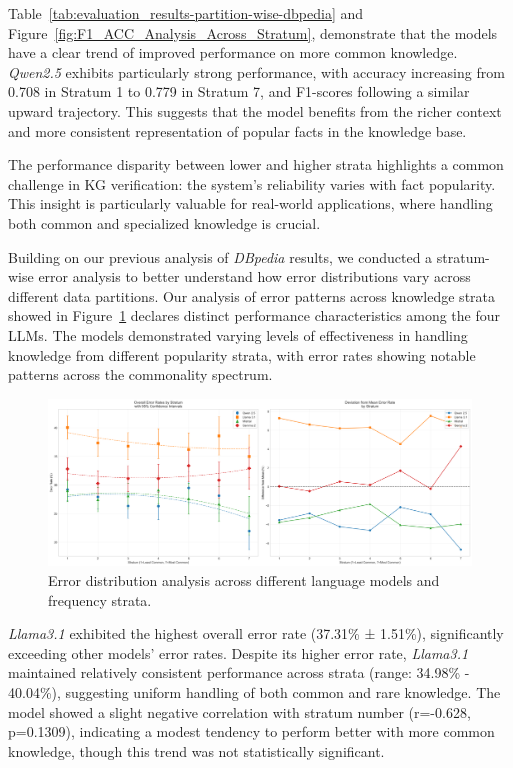 Table~\ref{tab:evaluation_results-partition-wise-dbpedia} and Figure~\ref{fig:F1_ACC_Analysis_Across_Stratum}, demonstrate that the models have a clear trend of improved performance on more common knowledge.
\textit{Qwen2.5} exhibits particularly strong performance, with accuracy increasing from 0.708 in Stratum 1 to 0.779 in Stratum 7, and F1-scores following a similar upward trajectory.
This suggests that the model benefits from the richer context and more consistent representation of popular facts in the knowledge base.

The performance disparity between lower and higher strata highlights a common challenge in \ac{KG} verification: the system's reliability varies with fact popularity.
This insight is particularly valuable for real-world applications, where handling both common and specialized knowledge is crucial.

Building on our previous analysis of \textit{DBpedia} results, we conducted a stratum-wise error analysis to better understand how error distributions vary across different data partitions.
Our analysis of error patterns across knowledge strata showed in Figure~\ref{fig:error_model-comparison_partition-wise} declares distinct performance characteristics among the four LLMs.
The models demonstrated varying levels of effectiveness in handling knowledge from different popularity strata, with error rates showing notable patterns across the commonality spectrum.

\begin{figure}[ht!]
    \centering
    \begin{minipage}[b]{\textwidth}
        \centering
        \includegraphics[width=\textwidth]{res/error_rates_analysis}
    \end{minipage}
    \caption{Error distribution analysis across different language models and frequency strata.}
    \label{fig:error_model-comparison_partition-wise}
\end{figure}

\textit{Llama3.1} exhibited the highest overall error rate (37.31\% ± 1.51\%), significantly exceeding other models' error rates.
Despite its higher error rate, \textit{Llama3.1} maintained relatively consistent performance across strata (range: 34.98\% - 40.04\%), suggesting uniform handling of both common and rare knowledge.
The model showed a slight negative correlation with stratum number (r=-0.628, p=0.1309), indicating a modest tendency to perform better with more common knowledge, though this trend was not statistically significant.


